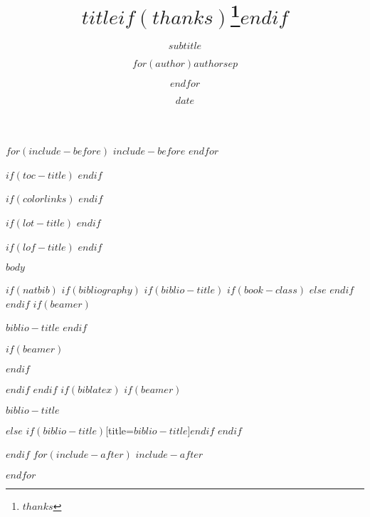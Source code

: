\documentclass[
	$if(fontsize)$
		$fontsize$,
	$endif$

	$if(lang)$
		$babel-lang$,
	$endif$

	$if(papersize)$
		$papersize$paper,
	$endif$

	$for(documentoptions)$
		$documentoptions$
		$sep$,
	$endfor$
]{
	$documentclass$
}
\title{$title$$if(thanks)$\thanks{$thanks$}$endif$}
\subtitle{$subtitle$}
\author{$for(author)$$author$$sep$ \and $endfor$}
\institute{$for(institute)$$institute$$sep$ \and $endfor$}
\date{$date$}
\newif\ifbibliography
\begin{document}
	$for(include-before)$
	$include-before$
	$endfor$

	$if(toc-title)$
	\renewcommand\contentsname{$toc-title$}
	$endif$

	$if(colorlinks)$
	\hypersetup{linkcolor=$if(toccolor)$$toccolor$$else$$endif$}
	$endif$
	\setcounter{tocdepth}{$toc-depth$}

	$if(lot-title)$
	\renewcommand\listtablename{$lot-title$}
	$endif$

	$if(lof-title)$
	\renewcommand\listfigurename{$lof-title$}
	$endif$

	$body$

	$if(natbib)$
	$if(bibliography)$
	$if(biblio-title)$
	$if(book-class)$
	\renewcommand\bibname{$biblio-title$}
	$else$
	\renewcommand\refname{$biblio-title$}
	$endif$
	$endif$
	$if(beamer)$
	\begin{frame}[allowframebreaks]{$biblio-title$}
		\bibliographytrue
		$endif$

		

		$if(beamer)$
	\end{frame}
	$endif$

	$endif$
	$endif$
	$if(biblatex)$
	$if(beamer)$
	\begin{frame}[allowframebreaks]{$biblio-title$}
		\bibliographytrue
		\printbibliography[heading=none]
	\end{frame}
	$else$
	\printbibliography$if(biblio-title)$[title=$biblio-title$]$endif$
	$endif$

	$endif$
	$for(include-after)$
	$include-after$

	$endfor$
\end{document}
